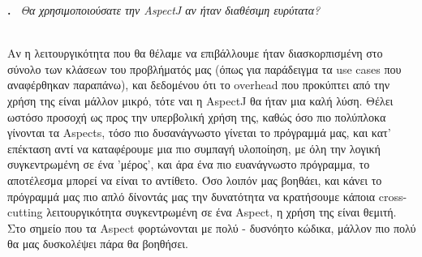 \documentclass[12pt]{article}
\newcounter{problem}
\newcounter{solution}
\newcommand\Problem{%
  \stepcounter{problem}%
  \textbf{\theproblem.}~%
  \setcounter{solution}{0}%
}
\newcommand\TheSolution{%
  \textbf{}\\%
}
\begin{document}
\Problem \textit{Θα χρησιμοποιούσατε την \textlatin{AspectJ} αν ήταν διαθέσιμη ευρύτατα?}

\TheSolution
Αν η λειτουργικότητα που θα θέλαμε να επιβάλλουμε ήταν διασκορπισμένη στο σύνολο των κλάσεων του προβλήματός μας (όπως για παράδειγμα τα \textlatin{use cases} 
που αναφέρθηκαν παραπάνω), και δεδομένου ότι το \textlatin{overhead} που προκύπτει από την χρήση της είναι μάλλον μικρό, τότε ναι η \textlatin{AspectJ} θα ήταν μια καλή
λύση. Θέλει ωστόσο προσοχή ως προς την υπερβολική χρήση της, καθώς όσο πιο πολύπλοκα γίνονται τα \textlatin{Aspects}, τόσο πιο δυσανάγνωστο γίνεται το πρόγραμμά
μας, και κατ' επέκταση αντί να καταφέρουμε μια πιο συμπαγή υλοποίηση, με όλη την λογική συγκεντρωμένη σε ένα 'μέρος', και άρα ένα πιο ευανάγνωστο πρόγραμμα,
το αποτέλεσμα μπορεί να είναι το αντίθετο. Όσο λοιπόν μας βοηθάει, και κάνει το πρόγραμμά μας πιο απλό δίνοντάς μας την δυνατότητα να κρατήσουμε κάποια
\textlatin{cross-cutting} λειτουργικότητα συγκεντρωμένη σε ένα \textlatin{Aspect}, η χρήση της είναι θεμιτή. Στο σημείο που τα \textlatin{Aspect} φορτώνονται με
πολύ - δυσνόητο κώδικα, μάλλον πιο πολύ θα μας δυσκολέψει πάρα θα βοηθήσει.
\end{document}
